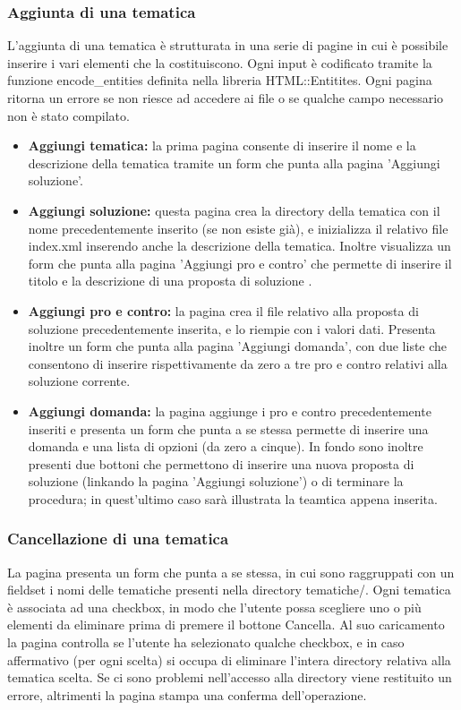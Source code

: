 \documentclass[a4paper,10pt]{article}
\begin{document}
\subsubsection{Aggiunta di una tematica}
L'aggiunta di una tematica \`e strutturata in una serie di pagine in cui \`e possibile inserire i vari elementi che la costituiscono. Ogni input \`e codificato tramite la funzione encode{\_}entities definita nella libreria HTML::Entitites. Ogni pagina ritorna un errore se non riesce ad accedere ai file o se qualche campo necessario non \`e stato compilato.
\begin{itemize}
\item \textbf{Aggiungi tematica:} la prima pagina consente di inserire il nome e la descrizione della tematica tramite un form che punta alla pagina 'Aggiungi soluzione'.
\item \textbf{Aggiungi soluzione:} questa pagina crea la directory della tematica con il nome precedentemente inserito (se non esiste gi\`a), e inizializza il relativo file index.xml inserendo anche la descrizione della tematica. Inoltre visualizza un form che punta alla pagina 'Aggiungi pro e contro' che permette di inserire il titolo e la descrizione di una proposta di soluzione .
\item \textbf{Aggiungi pro e contro:} la pagina crea il file relativo alla proposta di soluzione precedentemente inserita, e lo riempie con i valori dati. Presenta inoltre un form che punta alla pagina 'Aggiungi domanda', con due liste che consentono di inserire rispettivamente da zero a tre pro e contro relativi alla soluzione corrente. 
\item \textbf{Aggiungi domanda:} la pagina aggiunge i pro e contro precedentemente inseriti e presenta un form che punta a se stessa permette di inserire una domanda e una lista di opzioni (da zero a cinque). In fondo sono inoltre presenti due bottoni che permettono di inserire una nuova proposta di soluzione (linkando la pagina 'Aggiungi soluzione') o di terminare la procedura; in quest'ultimo caso sar\`a illustrata la teamtica appena inserita.
\end{itemize}

\subsubsection{Cancellazione di una tematica}
La pagina presenta un form che punta a se stessa, in cui sono raggruppati con un fieldset i  nomi delle tematiche presenti nella directory tematiche/. Ogni tematica \`e associata ad una checkbox, in modo che l'utente possa scegliere uno o pi\`u elementi da eliminare prima di premere il bottone Cancella. Al suo caricamento la pagina controlla se l'utente ha selezionato qualche checkbox, e in caso affermativo (per ogni scelta) si occupa di eliminare l'intera directory relativa alla tematica scelta.
Se ci sono problemi nell'accesso alla directory viene restituito un errore, altrimenti la pagina stampa una conferma dell'operazione.
\end{document}
